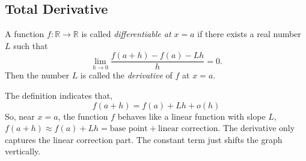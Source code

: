 
\subsection{Total Derivative}
\begin{definition}
A function $f:\mathbb{R}\to\mathbb{R}$ is called \emph{differentiable at $x=a$}
if there exists a real number $L$ such that
\[
\lim_{h\to 0}\frac{f(a+h)-f(a)-Lh}{h}=0.
\]
Then the number $L$ is called the \emph{derivative} of $f$ at $x=a$.
\end{definition}

The definition indicates that,
$$f(a+h)=f(a)+Lh+o(h)$$
So, near $x=a$, the function $f$ behaves like a linear function with slope $L$, $f(a+h) \approx f(a) + Lh=\text{base point}+\text{linear correction}$. The derivative only captures the linear correction part. The constant term just shifts the graph vertically.

